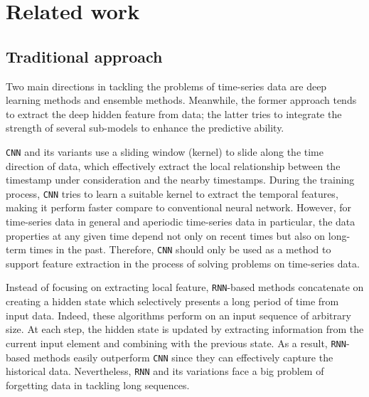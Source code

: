 \documentclass[a4paper,fleqn]{cas-sc}
\begin{document}
\section{Related work}

\subsection{Traditional approach}


Two main directions in tackling the problems of time-series data are deep learning methods and ensemble methods. Meanwhile, the former approach tends to extract the deep hidden feature from data; the latter tries to integrate the strength of several sub-models to enhance the predictive ability.

\vspace{1mm}


\verb|CNN| and its variants \cite{lecun1989handwritten, samarawickrama2019multi, zhao2020wavelet} use a sliding window (kernel) to slide along the time direction of data, which effectively extract the local relationship between the timestamp under consideration and the nearby timestamps. During the training process, \verb|CNN| tries to learn a suitable kernel to extract the temporal features, making it perform faster compare to conventional neural network. However, for time-series data in general and aperiodic time-series data in particular, the data properties at any given time depend not only on recent times but also on long-term times in the past. Therefore, \verb|CNN| should only be used as a method to support feature extraction in the process of solving problems on time-series data.

\vspace{1mm}

Instead of focusing on extracting local feature, \verb|RNN|-based methods \cite{lai2018modeling, rumelhart1986learning, shih2019temporal} concatenate on creating a hidden state which selectively presents a long period of time from input data. Indeed, these algorithms perform on an input sequence of arbitrary size. At each step, the hidden state is updated by extracting information from the current input element and combining with the previous state. As a result, \verb|RNN|-based methods easily outperform \verb|CNN| since they can effectively capture the historical data. Nevertheless, \verb|RNN| and its variations face a big problem of forgetting data in tackling long sequences.
\end{document}
